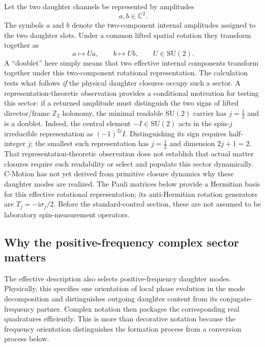 \documentclass[11pt]{article}
\theoremstyle{remark}
\newcommand{\cmotion}{\mbox{C-Motion}}
\newcommand{\ii}{\mathrm{i}}
\newcommand{\CC}{\mathbb{C}}
\newcommand{\SU}{\mathrm{SU}(2)}
\begin{document}
Let the two daughter channels be represented by amplitudes
\begin{equation}
  a,b\in\CC^2.
  \label{eq:doublets}
\end{equation}
The symbols \(a\) and \(b\) denote the two-component internal amplitudes assigned to the two daughter
slots.  Under a common lifted spatial rotation they transform together as
\begin{equation}
  a\mapsto Ua,
  \qquad
  b\mapsto Ub,
  \qquad
  U\in\SU.
  \label{eq:doublet_rotation}
\end{equation}
A ``doublet'' here simply means that two effective internal components transform together under this
two-component rotational representation.  The calculation tests what follows \emph{if} the physical
daughter closures occupy such a sector.  A representation-theoretic observation provides
a conditional motivation for testing this sector: if a returned
amplitude must distinguish the two signs of lifted director/frame
$\mathbb Z_2$ holonomy, the minimal readable \(\SU\) carrier has
$j=\frac12$ and is a doublet.  Indeed, the central element $-I\in\SU$
acts in the spin-$j$ irreducible representation as $(-1)^{2j}I$.
Distinguishing its sign requires half-integer $j$; the smallest such
representation has $j=\tfrac12$ and dimension $2j+1=2$.
That representation-theoretic observation
does not establish that actual matter closures require such readability or
select and populate this sector dynamically.  \cmotion{} has not yet
derived from primitive closure dynamics why these daughter modes are realized.  The Pauli matrices below provide a Hermitian basis for this effective rotational
representation; its anti-Hermitian rotation generators are \(T_j=-\ii\sigma_j/2\).
Before the standard-control section, these are not assumed to be laboratory
spin-measurement operators.

\subsection{Why the positive-frequency complex sector matters}

The effective description also selects positive-frequency daughter modes.  Physically, this
specifies one orientation of local phase evolution in the mode decomposition and distinguishes
outgoing daughter content from its conjugate-frequency partner.  Complex notation then packages the
corresponding real quadratures efficiently.  This is more than decorative notation because the
frequency orientation distinguishes the formation process from a conversion process below.
\end{document}
